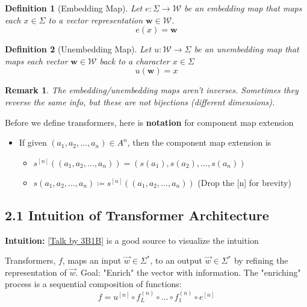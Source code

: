 \documentclass[12pt, twoside]{article}
\theoremstyle{spaceddefn}
\newtheorem{definition}{Definition}[section]
\newtheorem{remark}{Remark}[section]
\begin{document}
\begin{definition}[Embedding Map]
Let $e: \Sigma \to \mathcal{W}$ be an embedding map that maps each $x \in \Sigma$ to a vector representation $\mathbf{w} \in \mathcal{W}$.
$$ e(x) = \mathbf{w} $$
\end{definition}

\begin{definition}[Unembedding Map]
Let $u: \mathcal{W} \to \Sigma$ be an unembedding map that maps each vector $\mathbf{w} \in \mathcal{W}$ back to a character $x \in \Sigma$
$$ u(\mathbf{w}) = x $$
\end{definition}

\begin{remark}
    The embedding/unembedding maps aren't inverses. Sometimes they reverse the same info, but these are not bijections (different dimensions).
\end{remark}

\newpage

Before we define transformers, here is \textbf{notation} for component map extension
\begin{itemize}
    \item If given $(a_1,a_2,\dots,a_n)\in A^n$, then the component map extension is
        \begin{itemize}
        \item $s^{[n]}((a_1,a_2,\dots,a_n))=(s(a_1),s(a_2),\dots,s(a_n))$
        \item $s(a_1,a_2,...,a_n)\coloneqq s^{[n]}((a_1,a_2,\dots,a_n))$ (Drop the [n] for brevity)
    \end{itemize}
\end{itemize}

\subsection*{2.1 Intuition of Transformer Architecture }

\textbf{Intuition:} \href{https://www.youtube.com/watch?v=KJtZARuO3JY}{[Talk by 3B1B]} is a good source to visualize the intuition

Transformers, $f$, maps an input $\Vec{w}\in \Sigma^*$,  to an output $\Vec{w}\in \Sigma^*$ by refining the representation of $\Vec{w}$. Goal: "Enrich" the vector with information. The "enriching" process is a sequential composition of functions:
\[ f = u^{[n]} \circ f_L^{(n)} \circ \dots \circ f_1^{(n)} \circ e^{[n]} \]
\end{document}
